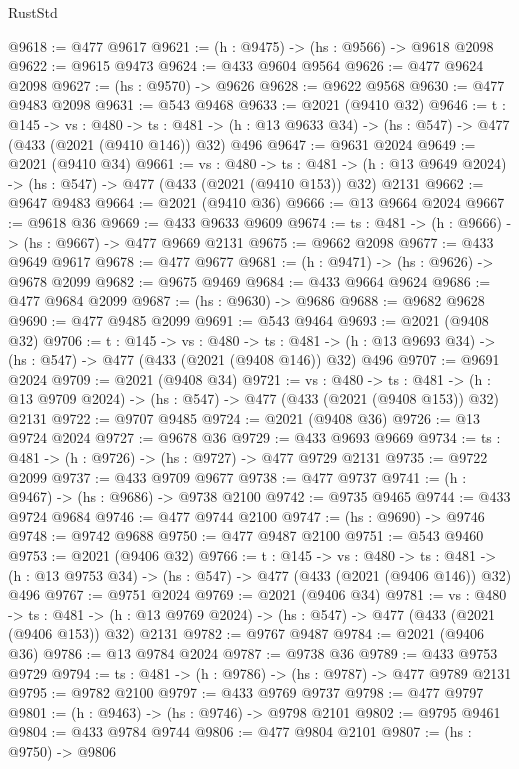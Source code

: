 \begin{lexlean}{RustStd}
\begin{coremodule}
@9618 := @477 @9617
@9621 := (h : @9475) -> (hs : @9566) -> @9618 @2098
@9622 := @9615 @9473
@9624 := @433 @9604 @9564
@9626 := @477 @9624 @2098
@9627 := (hs : @9570) -> @9626
@9628 := @9622 @9568
@9630 := @477 @9483 @2098
@9631 := @543 @9468
@9633 := @2021 (@9410 @32)
@9646 := {t : @145} ->
  {vs : @480} ->
  {ts : @481} -> (h : @13 @9633 @34) -> (hs : @547) -> @477 (@433 (@2021 (@9410 @146)) @32) @496
@9647 := @9631 @2024
@9649 := @2021 (@9410 @34)
@9661 := {vs : @480} ->
  {ts : @481} -> (h : @13 @9649 @2024) -> (hs : @547) -> @477 (@433 (@2021 (@9410 @153)) @32) @2131
@9662 := @9647 @9483
@9664 := @2021 (@9410 @36)
@9666 := @13 @9664 @2024
@9667 := @9618 @36
@9669 := @433 @9633 @9609
@9674 := {ts : @481} -> (h : @9666) -> (hs : @9667) -> @477 @9669 @2131
@9675 := @9662 @2098
@9677 := @433 @9649 @9617
@9678 := @477 @9677
@9681 := (h : @9471) -> (hs : @9626) -> @9678 @2099
@9682 := @9675 @9469
@9684 := @433 @9664 @9624
@9686 := @477 @9684 @2099
@9687 := (hs : @9630) -> @9686
@9688 := @9682 @9628
@9690 := @477 @9485 @2099
@9691 := @543 @9464
@9693 := @2021 (@9408 @32)
@9706 := {t : @145} ->
  {vs : @480} ->
  {ts : @481} -> (h : @13 @9693 @34) -> (hs : @547) -> @477 (@433 (@2021 (@9408 @146)) @32) @496
@9707 := @9691 @2024
@9709 := @2021 (@9408 @34)
@9721 := {vs : @480} ->
  {ts : @481} -> (h : @13 @9709 @2024) -> (hs : @547) -> @477 (@433 (@2021 (@9408 @153)) @32) @2131
@9722 := @9707 @9485
@9724 := @2021 (@9408 @36)
@9726 := @13 @9724 @2024
@9727 := @9678 @36
@9729 := @433 @9693 @9669
@9734 := {ts : @481} -> (h : @9726) -> (hs : @9727) -> @477 @9729 @2131
@9735 := @9722 @2099
@9737 := @433 @9709 @9677
@9738 := @477 @9737
@9741 := (h : @9467) -> (hs : @9686) -> @9738 @2100
@9742 := @9735 @9465
@9744 := @433 @9724 @9684
@9746 := @477 @9744 @2100
@9747 := (hs : @9690) -> @9746
@9748 := @9742 @9688
@9750 := @477 @9487 @2100
@9751 := @543 @9460
@9753 := @2021 (@9406 @32)
@9766 := {t : @145} ->
  {vs : @480} ->
  {ts : @481} -> (h : @13 @9753 @34) -> (hs : @547) -> @477 (@433 (@2021 (@9406 @146)) @32) @496
@9767 := @9751 @2024
@9769 := @2021 (@9406 @34)
@9781 := {vs : @480} ->
  {ts : @481} -> (h : @13 @9769 @2024) -> (hs : @547) -> @477 (@433 (@2021 (@9406 @153)) @32) @2131
@9782 := @9767 @9487
@9784 := @2021 (@9406 @36)
@9786 := @13 @9784 @2024
@9787 := @9738 @36
@9789 := @433 @9753 @9729
@9794 := {ts : @481} -> (h : @9786) -> (hs : @9787) -> @477 @9789 @2131
@9795 := @9782 @2100
@9797 := @433 @9769 @9737
@9798 := @477 @9797
@9801 := (h : @9463) -> (hs : @9746) -> @9798 @2101
@9802 := @9795 @9461
@9804 := @433 @9784 @9744
@9806 := @477 @9804 @2101
@9807 := (hs : @9750) -> @9806

\end{coremodule}
\end{lexlean}
